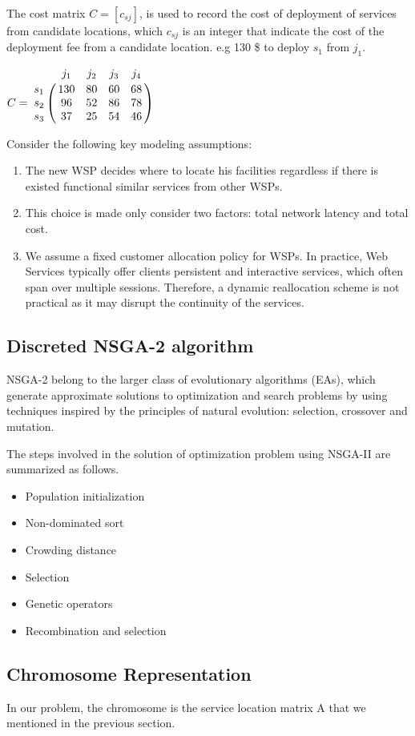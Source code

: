 \documentclass[11pt, a4paper, oneside, openright]{article}
\let\bbordermatrix\bordermatrix
\begin{document}
The cost matrix $C = [c_{sj}]$, is used to record the cost of deployment of services from candidate locations, 
which $c_{sj}$ is an integer that indicate the cost of the deployment fee from a candidate location. 
e.g 130 \$ to deploy $s_{1}$ from $j_{1}$.
\begin{center}
$
C = \bbordermatrix{~ & j_{1} & j_{2} & j_{3} & j_{4} \cr
					s_{1}	&130 &80 &60	&68	\cr
					s_{2}	&96  &52 &86	&78 \cr
					s_{3}	&37 &25 &54	&46 \cr} 
$
\end{center}

Consider the following key modeling assumptions:
\begin{enumerate}
	\item The new WSP decides where to locate his facilities regardless if there is existed functional similar services from other WSPs.
	\item This choice is made only consider two factors: total network latency and total cost.
	\item We assume a fixed customer allocation policy for WSPs. In practice, Web Services typically offer clients persistent and interactive services, which often span over multiple sessions. Therefore, a dynamic reallocation scheme is not practical as it may disrupt the continuity of the services.
\end{enumerate}

\subsection{Discreted NSGA-2 algorithm}
NSGA-2 belong to the larger class of evolutionary algorithms (EAs), which generate approximate solutions to 
optimization and search problems by using techniques inspired by the principles of natural 
evolution: selection, crossover and mutation.

The steps involved in the solution of optimization problem using NSGA-II are summarized as follows.
\begin{itemize}
	\item Population initialization
	\item Non-dominated sort
	\item Crowding distance
	\item Selection
	\item Genetic operators
	\item Recombination and selection
\end{itemize}

\subsection{Chromosome Representation}
In our problem, the chromosome is the service location matrix A that we mentioned in the previous section. 
\end{document}
